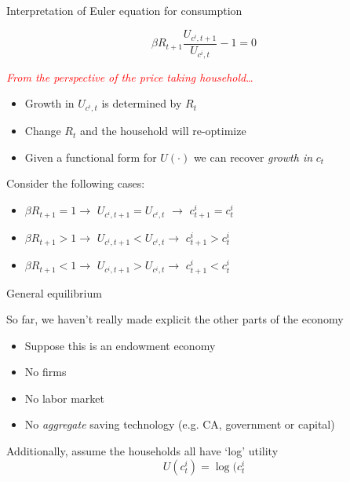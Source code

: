 \begin{frame}{Interpretation of Euler equation for consumption}

\begin{equation*}
\beta R_{t+1}\frac{U_{c^{i},t+1}}{U_{c^{i},t}}-1=0
\end{equation*}

\textcolor{red}{\textit{From the perspective of the price taking household}\ldots}
\begin{itemize}
\item 	Growth in $U_{c^{i},t}$ is determined by $R_{t}$
\item	Change $R_{t}$ and the household will re-optimize
\item	Given a functional form for $U(\cdot)$ we can recover \textit{growth in} $c_{t}$
\end{itemize}

\vspace{3mm}
Consider the following cases:
\begin{itemize}
\item $\beta R_{t+1}=1\rightarrow $ $U_{c^{i},t+1}=U_{c^{i},t}$ $\rightarrow$ $c_{t+1}^{i}=c_{t}^{i}$
\item $\beta R_{t+1}>1\rightarrow $ $U_{c^{i},t+1}<U_{c^{i},t}\rightarrow $ $c_{t+1}^{i}>c_{t}^{i}$
\item $\beta R_{t+1}<1\rightarrow $ $U_{c^{i},t+1}>U_{c^{i},t}\rightarrow $ $c_{t+1}^{i}<c_{t}^{i}$
\end{itemize}

\end{frame}


\begin{frame}{General equilibrium}

So far, we haven't really made explicit the other parts of the economy
\begin{itemize}
\item	Suppose this is an endowment economy
\item	No firms
\item	No labor market
\item	No \textit{aggregate} saving technology (e.g. CA, government or capital)
\end{itemize}

Additionally, assume the households all have `log' utility
\[
U(c_{t}^{i}) = \log{(c_{t}^{i}}
\]
\end{frame}

